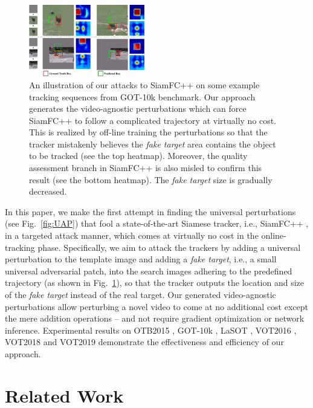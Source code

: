\documentclass[journal]{IEEEtran}
\newcommand{\ie}{i.e.}
\renewcommand{\uline}{}
\begin{document}
\begin{figure}[t]
  \centering
  \includegraphics[width=0.45\textwidth]{images_imperceptible/1_v8.pdf}
  \caption{An illustration of our attacks to SiamFC++ on some example tracking sequences from GOT-10k benchmark. Our approach generates the video-agnostic perturbations which can force SiamFC++ to follow a complicated trajectory at virtually no cost. This is realized by off-line training the perturbations so that the tracker mistakenly believes the \textit{fake target} area contains the object to be tracked (see the top heatmap). Moreover, the quality assessment branch in SiamFC++ is also misled to confirm this result (see the bottom heatmap). The \textit{fake target} size is gradually decreased.} 
  \label{fig:1}
  \vspace{-5mm}
\end{figure}
  
In this paper, we make the first attempt in finding the universal perturbations (see Fig.~\ref{fig:UAP}) that fool a state-of-the-art Siamese tracker, \ie, SiamFC++ \cite{SiamFC++}, in a targeted attack manner, which comes at virtually no cost in the online-tracking phase. Specifically, we aim to attack the trackers by adding a universal perturbation to the template image and adding a \textit{fake target}, \ie, a small universal adversarial patch, into the search \uline{images} adhering to the predefined trajectory (as shown in Fig.~\ref{fig:1}), so that the tracker outputs the location and size of the \textit{fake target} instead of the real target. Our generated video-agnostic perturbations allow perturbing a novel video to come at no additional cost except the mere addition operations -- and not require gradient optimization or network inference. Experimental results on OTB2015 \cite{OTB}, GOT-10k \cite{GOT-10k}, LaSOT \cite{LaSOT}, VOT2016 \cite{VOT2016}, VOT2018 \cite{VOT2018} and VOT2019 \cite{VOT2019} demonstrate the effectiveness and efficiency of our approach.

\section{Related Work}
\end{document}
